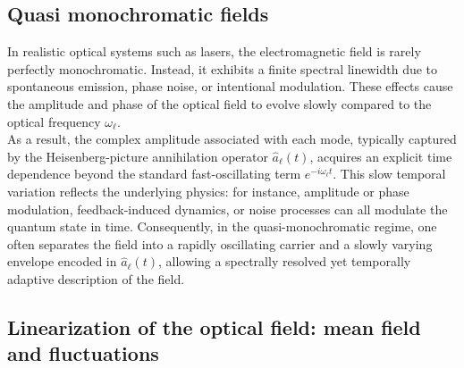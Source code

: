 \subsection*{Quasi monochromatic fields } 
In realistic optical systems such as lasers, the electromagnetic field is rarely perfectly monochromatic. Instead, it exhibits a finite spectral linewidth due to spontaneous emission, phase noise, or intentional modulation. These effects cause the amplitude and phase of the optical field to evolve slowly compared to the optical frequency $\omega_\ell$. \\

\noindent As a result, the complex amplitude associated with each mode, typically captured by the Heisenberg-picture annihilation operator $\hat{a}_\ell(t)$, acquires an explicit time dependence beyond the standard fast-oscillating term $e^{-i\omega_\ell t}$. This slow temporal variation reflects the underlying physics: for instance, amplitude or phase modulation, feedback-induced dynamics, or noise processes can all modulate the quantum state in time. Consequently, in the quasi-monochromatic regime, one often separates the field into a rapidly oscillating carrier and a slowly varying envelope encoded in $\hat{a}_\ell(t)$, allowing a spectrally resolved yet temporally adaptive description of the field. \\

\subsection*{Linearization of the optical field: mean field and fluctuations}

